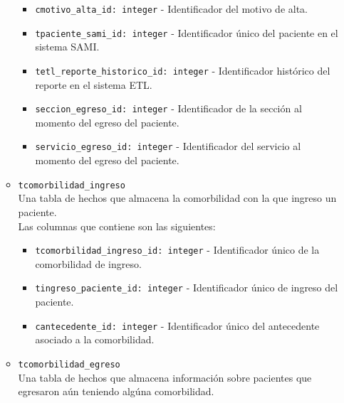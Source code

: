 \begin{itemize}
\begin{itemize}
\begin{itemize}
                \item \texttt{cmotivo\_alta\_id: integer} - Identificador del motivo de alta.
                
                \item \texttt{tpaciente\_sami\_id: integer} - Identificador único del paciente en el sistema SAMI.
                
                \item \texttt{tetl\_reporte\_historico\_id: integer} - Identificador histórico del reporte en el sistema ETL.
                
                \item \texttt{seccion\_egreso\_id: integer} - Identificador de la sección al momento del egreso del paciente.
                
                \item \texttt{servicio\_egreso\_id: integer} - Identificador del servicio al momento del egreso del paciente.
            \end{itemize}
            
            
            \item \texttt{tcomorbilidad\_ingreso}\\
            Una tabla de hechos que almacena la comorbilidad con la que ingreso un paciente.\\

            Las columnas que contiene son las siguientes:
            \begin{itemize}
                \item \texttt{tcomorbilidad\_ingreso\_id: integer} - Identificador único de la comorbilidad de ingreso.
                
                \item \texttt{tingreso\_paciente\_id: integer} - Identificador único de ingreso del paciente.
                
                \item \texttt{cantecedente\_id: integer} - Identificador único del antecedente asociado a la comorbilidad.
            \end{itemize}

            
            \item \texttt{tcomorbilidad\_egreso}\\
            Una tabla de hechos que almacena información sobre pacientes que egresaron aún teniendo algúna comorbilidad.\\


\end{itemize}
\end{itemize}
